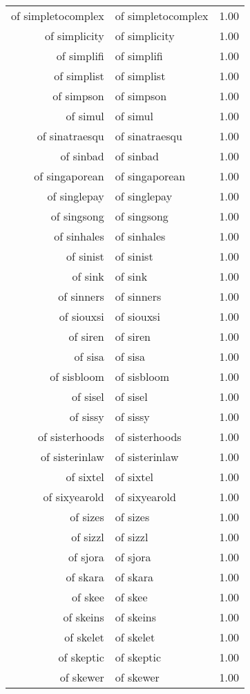 \begin{table}[ht]
\begin{tabular}{rlr}
  of simpletocomplex & of simpletocomplex & 1.00 \\ 
  of simplicity & of simplicity & 1.00 \\ 
  of simplifi & of simplifi & 1.00 \\ 
  of simplist & of simplist & 1.00 \\ 
  of simpson & of simpson & 1.00 \\ 
  of simul & of simul & 1.00 \\ 
  of sinatraesqu & of sinatraesqu & 1.00 \\ 
  of sinbad & of sinbad & 1.00 \\ 
  of singaporean & of singaporean & 1.00 \\ 
  of singlepay & of singlepay & 1.00 \\ 
  of singsong & of singsong & 1.00 \\ 
  of sinhales & of sinhales & 1.00 \\ 
  of sinist & of sinist & 1.00 \\ 
  of sink & of sink & 1.00 \\ 
  of sinners & of sinners & 1.00 \\ 
  of siouxsi & of siouxsi & 1.00 \\ 
  of siren & of siren & 1.00 \\ 
  of sisa & of sisa & 1.00 \\ 
  of sisbloom & of sisbloom & 1.00 \\ 
  of sisel & of sisel & 1.00 \\ 
  of sissy & of sissy & 1.00 \\ 
  of sisterhoods & of sisterhoods & 1.00 \\ 
  of sisterinlaw & of sisterinlaw & 1.00 \\ 
  of sixtel & of sixtel & 1.00 \\ 
  of sixyearold & of sixyearold & 1.00 \\ 
  of sizes & of sizes & 1.00 \\ 
  of sizzl & of sizzl & 1.00 \\ 
  of sjora & of sjora & 1.00 \\ 
  of skara & of skara & 1.00 \\ 
  of skee & of skee & 1.00 \\ 
  of skeins & of skeins & 1.00 \\ 
  of skelet & of skelet & 1.00 \\ 
  of skeptic & of skeptic & 1.00 \\ 
  of skewer & of skewer & 1.00 \\ 

\end{tabular}
\end{table}
